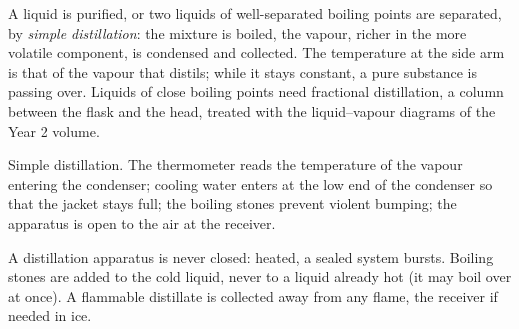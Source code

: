 A liquid is purified, or two liquids of well-separated boiling points are
separated, by \emph{simple distillation}: the mixture is boiled, the
vapour, richer in the more volatile component, is condensed and
collected. The temperature at the side arm is that of the vapour that
distils; while it stays constant, a pure substance is passing over.
Liquids of close boiling points need fractional distillation, a column
between the flask and the head, treated with the liquid--vapour diagrams
of the Year 2 volume.

\begin{omfigure}

{\small Simple distillation. The thermometer reads the temperature of the
vapour entering the condenser; cooling water enters at the low end of the
condenser so that the jacket stays full; the boiling stones prevent
violent bumping; the apparatus is open to the air at the receiver.}
\end{omfigure}

\begin{safety}{}
A distillation apparatus is never closed: heated, a sealed system bursts.
Boiling stones are added to the cold liquid, never to a liquid already
hot (it may boil over at once). A flammable distillate is collected away
from any flame, the receiver if needed in ice.
\end{safety}

